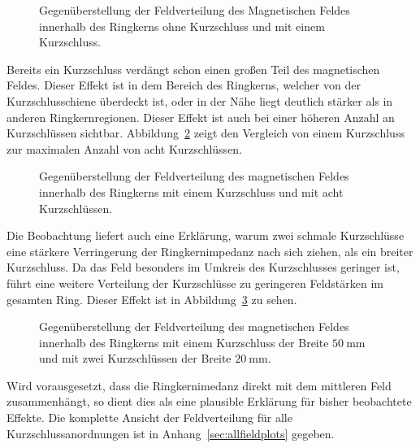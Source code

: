 \begin{figure}[htb]
	\centering
	\caption{Gegen\"uberstellung der Feldverteilung des Magnetischen Feldes innerhalb des Ringkerns ohne Kurzschluss und mit einem Kurzschluss.}
	\label{fig:0zu1ks}
\end{figure}
\par
Bereits ein Kurzschluss verd\"angt schon einen gro\ss{}en Teil des magnetischen Feldes. Dieser Effekt ist in dem Bereich des Ringkerns, welcher von der Kurzschlusschiene \"uberdeckt ist, oder in der N\"ahe liegt deutlich st\"arker als in anderen Ringkernregionen. Dieser Effekt ist auch bei einer h\"oheren Anzahl an Kurzschl\"ussen sichtbar. Abbildung~\ref{fig:1zu8ks} zeigt den Vergleich von einem Kurzschluss zur maximalen Anzahl von acht Kurzschl\"ussen.
\begin{figure}[htb]
	\centering
	\caption{Gegen\"uberstellung der Feldverteilung des magnetischen Feldes innerhalb des Ringkerns mit einem Kurzschluss und mit acht Kurzschl\"ussen.}
	\label{fig:1zu8ks}
\end{figure}
\par
Die Beobachtung liefert auch eine Erkl\"arung, warum zwei schmale Kurzschl\"usse eine st\"arkere Verringerung der Ringkernimpedanz nach sich ziehen, als ein breiter Kurzschluss. Da das Feld besonders im Umkreis des Kurzschlusses geringer ist, f\"uhrt eine weitere Verteilung der Kurzschl\"usse zu geringeren Feldst\"arken im gesamten Ring. Dieser Effekt ist in Abbildung~\ref{fig:150zu220ks} zu sehen. 
\begin{figure}[htb]
	\centering
	\caption{Gegen\"uberstellung der Feldverteilung des magnetischen Feldes innerhalb des Ringkerns mit einem Kurzschluss der Breite $\SI{50}{\milli\meter}$ und mit zwei Kurzschl\"ussen der Breite $\SI{20}{\milli\meter}$.}
	\label{fig:150zu220ks}
\end{figure}
\par
Wird vorausgesetzt, dass die Ringkernimedanz direkt mit dem mittleren Feld zusammenh\"angt, so dient dies als eine plausible Erkl\"arung f\"ur bisher beobachtete Effekte. Die komplette Ansicht der Feldverteilung f\"ur alle Kurzschlussanordnungen ist in Anhang~\ref{sec:allfieldplots} gegeben.